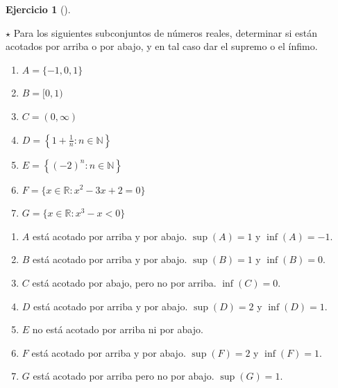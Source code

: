 \documentclass[
  a4paper,
]{scrreport}
\providecommand{\tightlist}{%
  \setlength{\itemsep}{0pt}\setlength{\parskip}{0pt}}\usepackage{longtable,booktabs,array}
\theoremstyle{definition}
\newtheorem{exercise}{Ejercicio}[chapter]
\theoremstyle{remark}
\begin{document}
\begin{exercise}[]\protect\hypertarget{exr-supremos-infimos-reales}{}\label{exr-supremos-infimos-reales}

\(\star\) Para los siguientes subconjuntos de números reales, determinar
si están acotados por arriba o por abajo, y en tal caso dar el supremo o
el ínfimo.

\begin{enumerate}
\def\labelenumi{\alph{enumi}.}
\tightlist
\item
  \(A = \{-1,0,1\}\)
\item
  \(B= [0,1)\)
\item
  \(C= (0,\infty)\)
\item
  \(D= \left\{1+\frac{1}{n}:n\in\mathbb{N}\right\}\)
\item
  \(E= \left\{(-2)^n:n\in\mathbb{N}\right\}\)
\item
  \(F= \{x\in\mathbb{R}:x^2-3x+2=0\}\)
\item
  \(G= \{x\in\mathbb{R}:x^3-x<0\}\)
\end{enumerate}

\end{exercise}

\begin{tcolorbox}[enhanced jigsaw, left=2mm, coltitle=black, colbacktitle=quarto-callout-tip-color!10!white, opacitybacktitle=0.6, colback=white, breakable, titlerule=0mm, toptitle=1mm, rightrule=.15mm, bottomtitle=1mm, bottomrule=.15mm, toprule=.15mm, leftrule=.75mm, arc=.35mm, opacityback=0, title=\textcolor{quarto-callout-tip-color}{\faLightbulb}\hspace{0.5em}{Solución}, colframe=quarto-callout-tip-color-frame]

\begin{enumerate}
\def\labelenumi{\alph{enumi}.}
\item
  \(A\) está acotado por arriba y por abajo. \(\sup(A)=1\) y
  \(\inf(A)=-1\).
\item
  \(B\) está acotado por arriba y por abajo. \(\sup(B)=1\) y
  \(\inf(B)=0\).
\item
  \(C\) está acotado por abajo, pero no por arriba. \(\inf(C)=0\).
\item
  \(D\) está acotado por arriba y por abajo. \(\sup(D)=2\) y
  \(\inf(D)=1\).
\item
  \(E\) no está acotado por arriba ni por abajo.
\item
  \(F\) está acotado por arriba y por abajo. \(\sup(F)=2\) y
  \(\inf(F)=1\).
\item
  \(G\) está acotado por arriba pero no por abajo. \(\sup(G)=1\).
\end{enumerate}

\end{tcolorbox}
\end{document}
